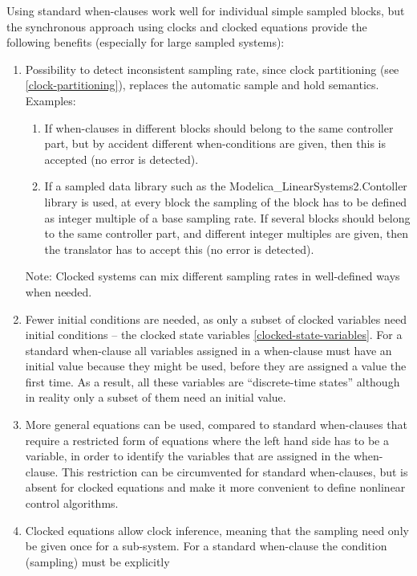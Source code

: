 \begin{nonnormative}
Using standard when-clauses work well for individual simple sampled blocks,
but the synchronous approach
using clocks and clocked equations provide the following benefits
(especially for large sampled systems):
\begin{enumerate}
\item
  Possibility to detect inconsistent sampling rate, since clock partitioning (see \cref{clock-partitioning}),
  replaces the automatic sample and hold semantics. Examples:
  \begin{enumerate}
  \def\labelenumii{\alph{enumii}.}
  \item
    If when-clauses in different blocks should belong to the same
    controller part, but by accident different when-conditions are
    given, then this is accepted (no error is detected).
  \item
    If a sampled data library such as the
    Modelica\_LinearSystems2.Contoller library is used, at every block
    the sampling of the block has to be defined as integer multiple of a
    base sampling rate. If several blocks should belong to the same
    controller part, and different integer multiples are given, then the
    translator has to accept this (no error is detected).
  \end{enumerate}
  Note: Clocked systems can mix different sampling rates
  in well-defined ways when needed.
\item
  Fewer initial conditions are needed, as only a subset of clocked
  variables need initial conditions -- the clocked state variables \cref{clocked-state-variables}.
  For a standard when-clause all variables
  assigned in a when-clause must have an initial value
  because they might be used, before they are assigned a value the first
  time. As a result, all these variables are ``discrete-time states''
  although in reality only a subset of them need an initial
  value.
\item
  More general equations can be used, compared to standard when-clauses that require
  a restricted form of equations where the left hand side has to be a variable, in order
  to identify the variables that are assigned in the when-clause.
  This restriction can be circumvented for standard when-clauses, but is
  absent for clocked equations and make it more convenient to define
  nonlinear control algorithms.
\item
  Clocked equations allow clock inference,
  meaning that the sampling need only be given once for a sub-system.
  For a standard when-clause the condition (sampling) must be explicitly

\end{enumerate}
\end{nonnormative}
